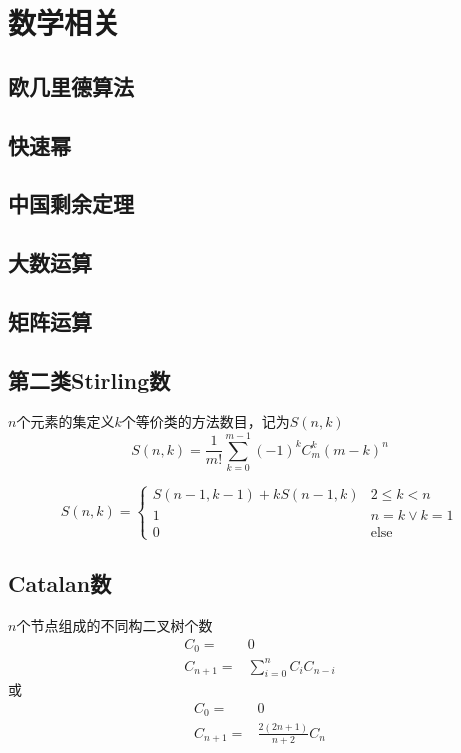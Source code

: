 \section{数学相关}
\subsection{欧几里德算法}


\subsection{快速幂}


\subsection{中国剩余定理}


\subsection{大数运算}


\subsection{矩阵运算}


\subsection{第二类Stirling数}
$n$个元素的集定义$k$个等价类的方法数目，记为$S(n,k)$
\begin{displaymath}
S(n, k) = \frac{1}{m!}\sum_{k=0}^{m-1}{(-1)^k C_m^k (m-k)^n}
\end{displaymath}

\begin{displaymath}
S(n, k) = 
\begin{cases}
S(n-1, k-1) + kS(n-1, k) & 2\leqslant k < n\\
1 & n=k \vee k=1 \\
0 & \text{else}
\end{cases}
\end{displaymath}
$$ $$


\subsection{Catalan数}
$n$个节点组成的不同构二叉树个数
\begin{align*}
C_0     = & 0 \\
C_{n+1} = & \sum_{i=0}^n C_i C_{n-i}
\end{align*}
或
\begin{align*}
C_0     = & 0 \\
C_{n+1} = & \frac{2(2n+1)}{n+2} C_n
\end{align*}


